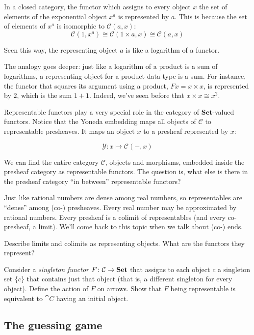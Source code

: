 \documentclass[DaoFP]{subfiles}
\begin{document}
In a closed category, the functor which assigns  to every object $x$ the set of elements of the exponential object $x^a$ is represented by $a$. This is because the set of elements of $x^a$ is isomorphic to $\mathcal{C}(a, x)$:
\[\mathcal{C}(1, x^a) \cong \mathcal{C}(1 \times a, x) \cong \mathcal{C} (a, x)\]

Seen this way, the representing object $a$ is like a logarithm of a functor. 

The analogy goes deeper: just like a logarithm of a product is a sum of logarithms, a representing object for a product data type is a sum. For instance, the functor that squares its argument using a product, $F x = x \times x$, is represented by $2$, which is the sum $1 + 1$. Indeed, we've seen before that $x \times x \cong x^2$.

Representable functors play a very special role in the category of $ \mathbf{Set}$-valued functors. Notice that the Yoneda embedding maps all objects of $\mathcal{C}$ to representable presheaves. It maps an object $x$ to a presheaf represented by $x$: 

\[  \mathcal{Y} \colon x \mapsto \mathcal{C}(-, x) \]

We can find the entire category  $\mathcal{C}$, objects and morphisms, embedded inside the presheaf category as representable functors. The question is, what else is there in the presheaf category ``in between'' representable functors?

Just like rational numbers are dense among real numbers, so representables are ``dense'' among (co-) presheaves. Every real number may be approximated by rational numbers. Every presheaf is a colimit of representables (and every co-presheaf, a limit). We'll come back to this topic when we talk about (co-) ends.

\begin{exercise}
Describe limits and colimits as representing objects. What are the functors they represent?
\end{exercise}
\begin{exercise}
Consider a \emph{singleton functor} $F \colon \mathcal{C} \to \mathbf{Set}$ that assigns to each object $c$ a singleton set $\{c\}$ that contains just that object (that is, a different singleton for every object). Define the action of $F$ on arrows. Show that $F$ being representable is equivalent to $\cat C$ having an initial object.
\end{exercise}

\subsection{The guessing game}
\end{document}
